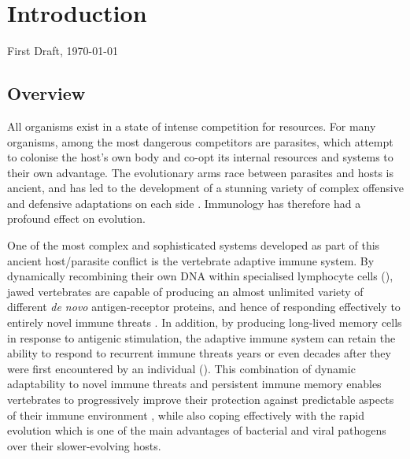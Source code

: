 
\chapter{Introduction}
\label{chap:intro}
\onehalfspacing

\ifdefineChapter
	{\LARGE First Draft, \today}
\fi

\pagebreak

\section{Overview}
\label{sec:intro_overview}

All organisms exist in a state of intense competition for resources. For many organisms, among the most dangerous competitors are parasites, which attempt to colonise the host's own body and co-opt its internal resources and systems to their own advantage. The evolutionary arms race between parasites and hosts is ancient, and has led to the development of a stunning variety of complex offensive and defensive adaptations on each side \parencite{jack2015evolution}. Immunology has therefore had a profound effect on evolution.

One of the most complex and sophisticated systems developed as part of this ancient host/parasite conflict is the vertebrate adaptive immune system. By dynamically recombining their own DNA within specialised lymphocyte cells (), jawed vertebrates are capable of producing an almost unlimited variety of different \textit{de novo} antigen-receptor proteins, and hence of responding effectively to entirely novel immune threats \parencite{jack2015evolution}. In addition, by producing long-lived memory cells in response to antigenic stimulation, the adaptive immune system can retain the ability to respond to recurrent immune threats years or even decades after they were first encountered by an individual \parencite{kurosaki2015memory} (). This combination of dynamic adaptability to novel immune threats and persistent immune memory enables vertebrates to progressively improve their protection against predictable aspects of their immune environment \parencite{mayer2018memory}, while also coping effectively with the rapid evolution which is one of the main advantages of bacterial and viral pathogens over their slower-evolving hosts.

